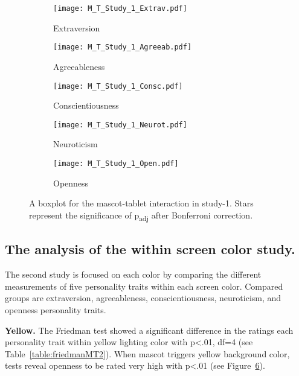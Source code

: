 \begin{figure}[hbt!]
    \centering
    \begin{subfigure}{.45\textwidth}
        \centering
        \texttt{[image: M\_T\_Study\_1\_Extrav.pdf]}
        \caption{Extraversion}
        \label{fig:sub1}
    \end{subfigure}\hfill%
    \begin{subfigure}{.45\textwidth}
        \centering
        \texttt{[image: M\_T\_Study\_1\_Agreeab.pdf]}
        \caption{Agreeableness}
        \label{fig:sub2}
    \end{subfigure}\hfill
    \begin{subfigure}{.45\textwidth}
        \centering
        \texttt{[image: M\_T\_Study\_1\_Consc.pdf]}
        \caption{Conscientiousness}
        \label{fig:sub1}
    \end{subfigure}\hfill%
    \begin{subfigure}{.45\textwidth}
        \centering
        \texttt{[image: M\_T\_Study\_1\_Neurot.pdf]}
        \caption{Neuroticism}
        \label{fig:sub1}
    \end{subfigure}\hfill%
    \begin{subfigure}{.45\textwidth}
        \centering
        \texttt{[image: M\_T\_Study\_1\_Open.pdf]}
        \caption{Openness}
        \label{fig:sub1}
    \end{subfigure}\hfill%
    \caption{A boxplot for the mascot-tablet interaction in study-1.
    Stars represent the significance of p\textsubscript{adj} after Bonferroni correction.}
    \label{fig:MT1}
\end{figure}
\subsection{The analysis of the within screen color study.}
\label{subsec:MTstudy2}
The second study is focused on each color by comparing the different measurements of five
personality traits within each screen color.
Compared groups are extraversion, agreeableness, conscientiousness, neuroticism, and openness personality traits.

\par\textbf{Yellow.}
The Friedman test showed a significant difference in the ratings each personality trait
within yellow lighting color with p<.01, df=4 (see Table~\ref{table:friedmanMT2}).
When mascot triggers yellow background color, tests reveal openness
to be rated very high with p<.01 (see Figure~\ref{fig:MT1}).


